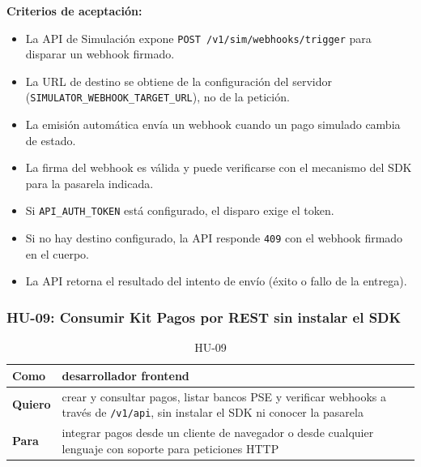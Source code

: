 \textbf{Criterios de aceptación:}
\begin{itemize}
  \item La API de Simulación expone \texttt{POST /v1/sim/webhooks/trigger} para disparar un webhook firmado.
  \item La URL de destino se obtiene de la configuración del servidor (\texttt{SIMULATOR\_WEBHOOK\_TARGET\_URL}), no de la petición.
  \item La emisión automática envía un webhook cuando un pago simulado cambia de estado.
  \item La firma del webhook es válida y puede verificarse con el mecanismo del SDK para la pasarela indicada.
  \item Si \texttt{API\_AUTH\_TOKEN} está configurado, el disparo exige el token.
  \item Si no hay destino configurado, la API responde \texttt{409} con el webhook firmado en el cuerpo.
  \item La API retorna el resultado del intento de envío (éxito o fallo de la entrega).
\end{itemize}

\subsubsection{HU-09: Consumir Kit Pagos por REST sin instalar el SDK}
\begin{table}[H]
  \centering
  \renewcommand{\arraystretch}{1.2}
  \begin{tabularx}{\textwidth}{|l|X|}
    \hline
    \textbf{Como} & desarrollador frontend \\
    \hline
    \textbf{Quiero} & crear y consultar pagos, listar bancos PSE y verificar webhooks a través de \texttt{/v1/api}, sin instalar el SDK ni conocer la pasarela \\
    \hline
    \textbf{Para} & integrar pagos desde un cliente de navegador o desde cualquier lenguaje con soporte para peticiones HTTP \\
    \hline
  \end{tabularx}
  \caption{HU-09}
  \label{tab:hu-09}
\end{table}

